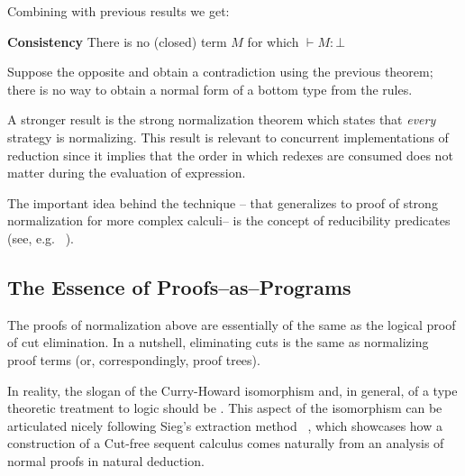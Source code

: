 Combining with previous results we get:
\begin{theorem}
\begin{mdframed}
\textbf{Consistency}
There is no (closed) term $M$ for which $\vdash M:\bot$ 
\end{mdframed}
\end{theorem}
 Suppose the opposite and obtain a contradiction 
 using the previous theorem; there is no way to obtain a normal form of a bottom type from the rules.  
 
 A stronger result is the strong normalization theorem which states that \textit{every} 
 strategy is normalizing. This result is relevant to concurrent 
 implementations of reduction since it implies that the order 
 in which redexes are consumed does not matter during the evaluation of  expression. 
 
 The important idea behind the technique -- that generalizes to proof of 
 strong normalization for more complex calculi-- is the concept of  reducibility predicates (see, e.g. ~\cite{prawitz1971ideas}). 
 

\subsection{The Essence of Proofs--as--Programs }
The proofs of normalization above are essentially of the same 
  as the logical proof of cut elimination. 
In a nutshell, eliminating cuts is the same as normalizing proof 
terms (or, correspondingly, proof trees).

In reality, the slogan of the Curry-Howard isomorphism and, 
in general, of a type theoretic treatment to logic should be . 
This aspect of the isomorphism can be articulated 
nicely following Sieg's extraction method ~\cite{Sieg1998}, which  
showcases how a construction of a Cut-free sequent 
calculus comes naturally from an analysis of normal proofs 
in natural deduction. 
